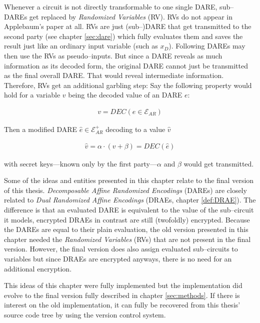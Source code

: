 \label{sec:rv}

Whenever a circuit is not directly transformable to one single DARE, sub--DAREs
get replaced by \emph{Randomized Variables} (RV). RVs do not appear in
Applebaum's paper\cite{gac2012} at all. RVs are just (sub--)DARE that
get transmitted to the second party (see chapter \ref{sec:dare}) which
fully evaluates them and saves the result just like an ordinary input variable
(such as $x_D$). Following DAREs may then use the RVs as pseudo--inputs. But
since a DARE reveals as much information as its decoded form, the original DARE
cannot just be transmitted as the final overall DARE. That would reveal
intermediate information. Therefore, RVs get an additional garbling step: Say
the following property would hold for a variable $v$ being the decoded value of
an DARE $e$:

\begin{align*}
  v = DEC(e \in \mathcal{E}_{AR})
\end{align*}

\noindent{}Then a modified DARE $\hat{e} \in \mathcal{E}_{AR}^+$ decoding to a
value $\hat{v}$

\begin{align*}
\hat{v} = \alpha \cdot (v + \beta) = DEC(\hat{e})
\end{align*}

\noindent{}with secret keys---known only by the first party---$\alpha$ and
$\beta$ would get transmitted.



Some of the ideas and entities presented in this chapter relate to the final
version of this thesis. \emph{Decomposable Affine Randomized Encodings} (DAREs)
are closely related to \emph{Dual Randomized Affine Encodings} (DRAEs, chapter
\ref{def:DRAE}). The difference is that an evaluated DARE is equivalent to the
value of the sub--circuit it models, encrypted DRAEs in contrast are still
(twofoldly) encrypted. Because the DAREs are equal to their plain evaluation,
the old version presented in this chapter needed the \emph{Randomized Variables}
(RVs) that are not present in the final version. However, the final version does
also assign evaluated sub--circuits to variables but since DRAEs are encrypted
anyways, there is no need for an additional encryption.



This ideas of this chapter were fully implemented but the implementation did
evolve to the final version fully described in chapter \ref{sec:methods}. If
there is interest on the old implementation, it can fully be recovered from this
thesis' source code tree by using the \JWTgit{} version control system.

